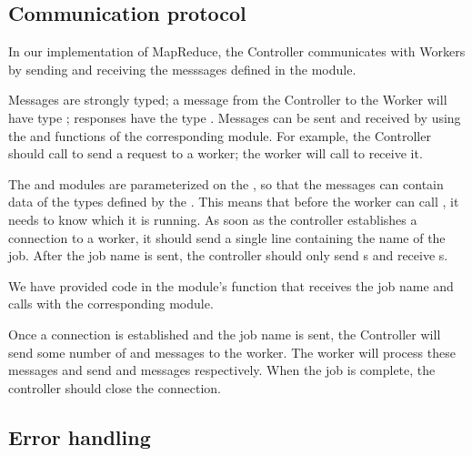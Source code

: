 \documentclass{pset}
\begin{document}
\subsection*{Communication protocol}

In our implementation of MapReduce, the Controller communicates with Workers
by sending and receiving the messsages defined in the  module.

Messages are strongly typed; a message from the Controller to the Worker will
have type ; responses have the type
.  Messages can be sent and received by using the
 and  functions of the corresponding module.  For
example, the Controller should call  to send a request
to a worker; the worker will call  to receive it.

The  and  modules are parameterized on
the , so that the messages can contain data of the types defined by
the .  This means that before the worker can call , it
needs to know which  it is running.  As soon as the controller
establishes a connection to a worker, it should send a single line containing
the name of the job.  After the job name is sent, the controller should only
send s and receive s.

We have provided code in the  module's  function that
receives the job name and calls  with the corresponding
module.

Once a connection is established and the job name is sent, the Controller will
send some number of  and
 messages to the worker.  The worker will
process these messages and send  and
 messages respectively.  When the job is
complete, the controller should close the connection.

\subsection*{Error handling}
\end{document}
